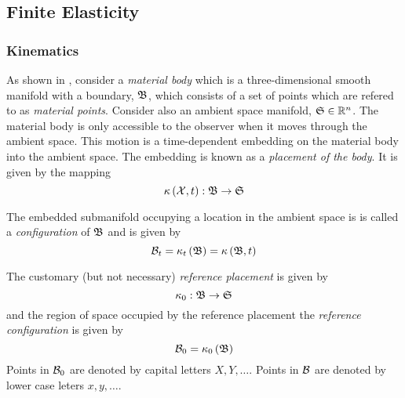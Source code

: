 \subsection{Finite Elasticity}
\label{subsec:FiniteElasticity}


\subsubsection{Kinematics}

As shown in , consider a \emph{material
  body} which is a three-dimensional smooth manifold with a boundary, $ \mathfrak{B} $,
which consists of a set of points which are refered to as \emph{material
  points}. Consider also an ambient space manifold,
$\manifold{S}\in\rntopology{n}$. The material body is only accessible to
the observer when it moves through the ambient space. This motion is a
time-dependent embedding on the material body into the ambient space. The
embedding is known as a \emph{placement of the body}. It is given by the
mapping
\begin{equation}
   \kappa\left( \mathcal{X},t \right) : \mathfrak{B} \rightarrow \mathfrak{S} 
\end{equation}

The embedded submanifold occupying a location in the ambient space is is
called a \emph{configuration} of $ \mathfrak{B} $ and is given by
\begin{equation}
   \mathcal{B} _{t}= \kappa_{t}\left(  \mathfrak{B}  \right) = \kappa\left(  \mathfrak{B} ,t \right) 
\end{equation}

The customary (but not necessary) \emph{reference placement} is given by
\begin{equation}
  \kappa_{0}: \mathfrak{B} \rightarrow \mathfrak{S} 
\end{equation}
and the region of space occupied by the reference placement \ie the
\emph{reference configuration} is given by
\begin{equation}
   \mathcal{B} _{0}= \kappa_{0}\left(  \mathfrak{B}  \right) 
\end{equation}
Points in $ \mathcal{B} _{0}$ are denoted by capital letters \ie $X, Y,
\ldots$. Points in $ \mathcal{B} $ are denoted by lower case leters \ie
$x, y, \dots$.


